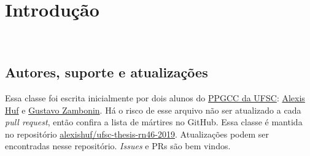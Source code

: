 \documentclass[
  english,
  lmodern,
  oneside
]{ufsc-thesis-rn46-2019/ufsc-thesis-rn46-2019}
\begin{document}
\begin{listadesimbolos}
\end{listadesimbolos}

\tableofcontents*%

\textual{}

\chapter{Introdução}~\label{ch:intro}

\section{Autores, suporte e atualizações}

Essa classe foi escrita inicialmente por dois alunos do
\href{http://ppgcc.posgrad.ufsc.br/}{PPGCC da UFSC}:
\href{mailto:alexishuf@gmail.com}{Alexis Huf} e
\href{mailto:gustavo.zambonin@posgrad.ufsc.br}{Gustavo Zambonin}.
Há o risco de esse arquivo não ser atualizado a cada \textit{pull request},
então confira a lista de mártires no GitHub. Essa classe é mantida no
repositório
\href{https://github.com/alexishuf/ufsc-thesis-rn46-2019/}{alexishuf/ufsc-thesis-rn46-2019}.
Atualizações podem ser encontradas nesse repositório. \textit{Issues} e PRs são
bem vindos.
\end{document}
